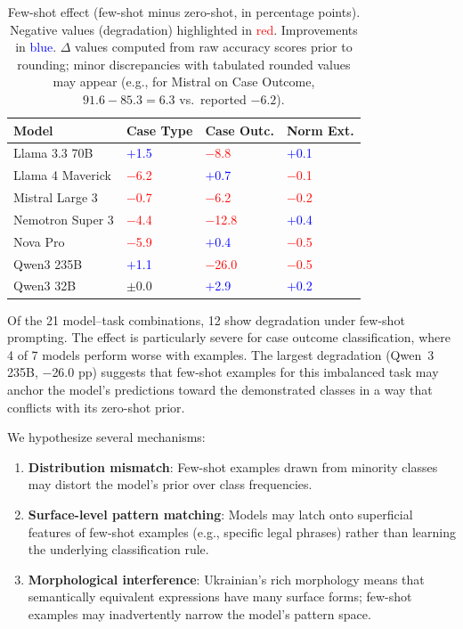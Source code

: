 \documentclass[11pt,a4paper]{article}
\begin{document}
\begin{table}[t]
\centering
\caption{Few-shot effect (few-shot minus zero-shot, in percentage points). Negative values (degradation) highlighted in \textcolor{red}{red}. Improvements in \textcolor{blue}{blue}. $\Delta$ values computed from raw accuracy scores prior to rounding; minor discrepancies with tabulated rounded values may appear (e.g., for Mistral on Case Outcome, $91.6 - 85.3 = 6.3$ vs.\ reported $-6.2$).}
\label{tab:fewshot_delta}
\begin{tabular}{lR{2.0cm}R{2.0cm}R{2.0cm}}
\toprule
\textbf{Model} & \textbf{Case Type} & \textbf{Case Outc.} & \textbf{Norm Ext.} \\
\midrule
Llama 3.3 70B     & \textcolor{blue}{$+$1.5}  & \textcolor{red}{$-$8.8}  & \textcolor{blue}{$+$0.1} \\
Llama 4 Maverick  & \textcolor{red}{$-$6.2}   & \textcolor{blue}{$+$0.7} & \textcolor{red}{$-$0.1} \\
Mistral Large 3   & \textcolor{red}{$-$0.7}   & \textcolor{red}{$-$6.2}  & \textcolor{red}{$-$0.2} \\
Nemotron Super 3  & \textcolor{red}{$-$4.4}   & \textcolor{red}{$-$12.8} & \textcolor{blue}{$+$0.4} \\
Nova Pro          & \textcolor{red}{$-$5.9}   & \textcolor{blue}{$+$0.4}  & \textcolor{red}{$-$0.5} \\
Qwen3 235B        & \textcolor{blue}{$+$1.1}  & \textcolor{red}{$-$26.0} & \textcolor{red}{$-$0.5} \\
Qwen3 32B         & $\pm$0.0                  & \textcolor{blue}{$+$2.9} & \textcolor{blue}{$+$0.2} \\
\bottomrule
\end{tabular}
\end{table}

Of the 21 model--task combinations, 12 show degradation under few-shot prompting. The effect is particularly severe for case outcome classification, where 4 of 7 models perform worse with examples. The largest degradation (Qwen~3 235B, $-$26.0 pp) suggests that few-shot examples for this imbalanced task may anchor the model's predictions toward the demonstrated classes in a way that conflicts with its zero-shot prior.

We hypothesize several mechanisms:
\begin{enumerate}[leftmargin=*]
    \item \textbf{Distribution mismatch}: Few-shot examples drawn from minority classes may distort the model's prior over class frequencies.
    \item \textbf{Surface-level pattern matching}: Models may latch onto superficial features of few-shot examples (e.g., specific legal phrases) rather than learning the underlying classification rule.
    \item \textbf{Morphological interference}: Ukrainian's rich morphology means that semantically equivalent expressions have many surface forms; few-shot examples may inadvertently narrow the model's pattern space.
\end{enumerate}
\end{document}
